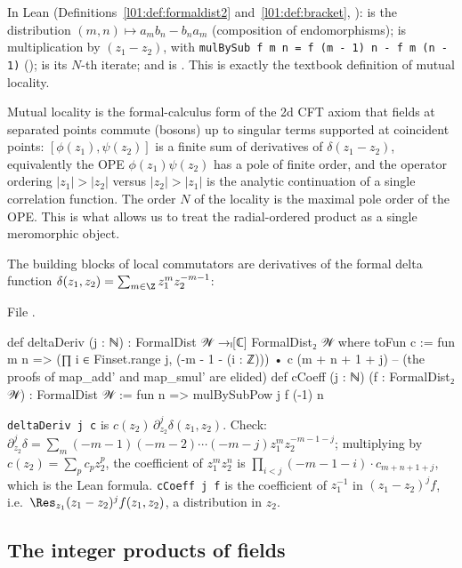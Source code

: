 In Lean (Definitions~\ref{l01:def:formaldist2} and~\ref{l01:def:bracket},
):  is the distribution
$(m,n)\mapsto a_mb_n-b_na_m$ (composition of endomorphisms);  is multiplication by
$(z_1-z_2)$, with \verb|mulBySub f m n = f (m - 1) n - f m (n - 1)| ();
 is its $N$-th iterate; and  is
. This is exactly the textbook definition of
mutual locality.

\begin{physics}
Mutual locality is the formal-calculus form of the 2d CFT axiom that fields at separated points commute (bosons) up to singular terms supported at coincident points: $[\phi(z_1),\psi(z_2)]$ is a finite sum of derivatives of $\delta(z_1-z_2)$, equivalently the OPE $\phi(z_1)\psi(z_2)$ has a pole of finite order, and the operator ordering $|z_1|>|z_2|$ versus $|z_2|>|z_1|$ is the analytic continuation of a single correlation function. The order $N$ of the locality is the maximal pole order of the OPE. This is what allows us to treat the radial-ordered product as a single meromorphic object.
\end{physics}

The building blocks of local commutators are derivatives of the formal delta function
$\delta(z_1,z_2) = \sum_{m\in\Z} z_1^m z_2^{-m-1}$:

\noindent File .
\begin{leancode}
def deltaDeriv (j : ℕ) : FormalDist 𝒲 →ₗ[ℂ] FormalDist₂ 𝒲 where
  toFun c := fun m n => (∏ i ∈ Finset.range j, (-m - 1 - (i : ℤ))) • c (m + n + 1 + j)
  -- (the proofs of map_add' and map_smul' are elided)
def cCoeff (j : ℕ) (f : FormalDist₂ 𝒲) : FormalDist 𝒲 := fun n => mulBySubPow j f (-1) n
\end{leancode}

\begin{dictionary}
\verb|deltaDeriv j c| is $c(z_2)\,\partial_{z_2}^j\delta(z_1,z_2)$. Check: $\partial_{z_2}^j
\delta = \sum_m (-m-1)(-m-2)\cdots(-m-j) z_1^m z_2^{-m-1-j}$; multiplying by
$c(z_2)=\sum_p c_p z_2^p$, the coefficient of $z_1^m z_2^n$ is
$\prod_{i<j}(-m-1-i)\cdot c_{m+n+1+j}$, which is the Lean formula. \verb|cCoeff j f| is the
coefficient of $z_1^{-1}$ in $(z_1-z_2)^j f$, i.e.\ $\Res_{z_1}(z_1-z_2)^j f(z_1,z_2)$, a
distribution in $z_2$.
\end{dictionary}

\subsection{The integer products of fields}\label{ch07:sec:prod}


